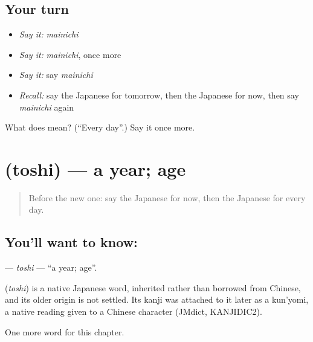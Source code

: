 \subsection*{Your turn}
\begin{itemize}
\raggedright
  \item \emph{Say it:} \emph{mainichi}
  \item \emph{Say it:} \emph{mainichi}, once more
  \item \emph{Say it:} say \emph{mainichi}
  \item \emph{Recall:} say the Japanese for tomorrow, then the Japanese for now, then say \emph{mainichi} again
\end{itemize}

\begin{tcolorbox}[breakable,colback=teal!4,colframe=teal!35!black,title={Before you move on}]
What does  mean? (\textquotedblleft{}Every day\textquotedblright{}.) Say it once more.
\end{tcolorbox}
\section[\texorpdfstring{\ja{とし} (toshi)}{とし (toshi)}]{ (toshi) — a year; age}

\label{lesson:JA-C54-toshi}



\begin{quote}
Before the new one: say the Japanese for now, then the Japanese for every day.
\end{quote}

\subsection*{You'll want to know: }
\textbf{} — \emph{toshi} — \textquotedblleft{}a year; age\textquotedblright{}.

\begin{cousinweb}
\textbf{} (\emph{toshi}) is a native Japanese word, inherited rather than borrowed from Chinese, and its older origin is not settled. Its kanji was attached to it later as a kun'yomi, a native reading given to a Chinese character (JMdict, KANJIDIC2).
\end{cousinweb}

\begin{grammarlens}[title={What you've built}]
One more word for this chapter.
\end{grammarlens}

